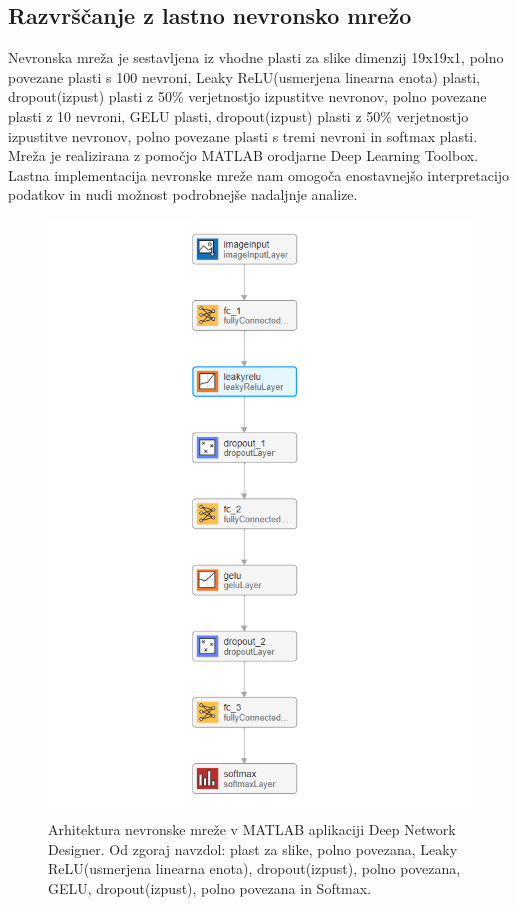 \subsection{Razvrščanje z lastno nevronsko mrežo}
Nevronska mreža je sestavljena iz vhodne plasti za slike dimenzij 19x19x1, polno povezane plasti s 100 nevroni, Leaky ReLU(usmerjena linearna enota) plasti, dropout(izpust) plasti z 50\% verjetnostjo izpustitve nevronov, polno povezane plasti z 10 nevroni, GELU plasti, dropout(izpust) plasti z 50\% verjetnostjo izpustitve nevronov, polno povezane plasti s tremi nevroni in softmax plasti. Mreža je realizirana z pomočjo MATLAB orodjarne Deep Learning Toolbox. Lastna implementacija nevronske mreže nam omogoča enostavnejšo interpretacijo podatkov in nudi možnost podrobnejše nadaljnje analize.
\begin{figure}[h!]
\begin{center}
\includegraphics[width=0.8\linewidth]{slike/Neural network.png}
\end{center}
\caption{Arhitektura nevronske mreže v MATLAB aplikaciji Deep Network Designer. Od zgoraj navzdol: plast za slike, polno povezana, Leaky ReLU(usmerjena linearna enota), dropout(izpust), polno povezana, GELU, dropout(izpust), polno povezana in Softmax.}
\end{figure}






